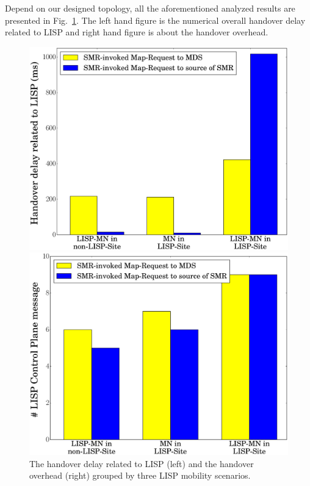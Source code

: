 Depend on our designed topology, all the aforementioned analyzed results are presented in Fig.~\ref{handover_delay_overhead_bar}. The left hand figure is the numerical overall handover delay related to LISP and right hand figure is about the handover overhead.
\begin{figure}[!t]
	\begin{minipage}[c]{.5\linewidth}
		\begin{center}
			\includegraphics[width=\linewidth]{Pics/LISP_handover_delay_Bar.eps}
		\end{center}
	\end{minipage}
	\begin{minipage}[c]{.5\linewidth}
		\begin{center}
			\includegraphics[width=\linewidth]{Pics/LISP_handover_overhead_Bar}
		\end{center}
	\end{minipage}
	\caption{The handover delay related to LISP (left) and the handover overhead (right) grouped by three LISP mobility scenarios.}
	\label{handover_delay_overhead_bar}
\end{figure}

